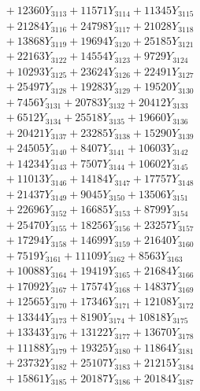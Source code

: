 \documentclass[a4paper,10pt]{article}
\begin{document}
{\begin{align}
&\;  + 12360 Y_{3113} + 11571 Y_{3114} + 11345 Y_{3115} \\[0.3ex]
&\;  + 21284 Y_{3116} + 24798 Y_{3117} + 21028 Y_{3118} \\[0.5ex]\allowbreak
&\;  + 13868 Y_{3119} + 19694 Y_{3120} + 25185 Y_{3121} \\[0.3ex]
&\;  + 22163 Y_{3122} + 14554 Y_{3123} + 9729 Y_{3124} \\[0.3ex]
&\;  + 10293 Y_{3125} + 23624 Y_{3126} + 22491 Y_{3127} \\[0.3ex]
&\;  + 25497 Y_{3128} + 19283 Y_{3129} + 19520 Y_{3130} \\[0.3ex]
&\;  + 7456 Y_{3131} + 20783 Y_{3132} + 20412 Y_{3133} \\[0.3ex]
&\;  + 6512 Y_{3134} + 25518 Y_{3135} + 19660 Y_{3136} \\[0.3ex]
&\;  + 20421 Y_{3137} + 23285 Y_{3138} + 15290 Y_{3139} \\[0.3ex]
&\;  + 24505 Y_{3140} + 8407 Y_{3141} + 10603 Y_{3142} \\[0.3ex]
&\;  + 14234 Y_{3143} + 7507 Y_{3144} + 10602 Y_{3145} \\[0.3ex]
&\;  + 11013 Y_{3146} + 14184 Y_{3147} + 17757 Y_{3148} \\[0.5ex]\allowbreak
&\;  + 21437 Y_{3149} + 9045 Y_{3150} + 13506 Y_{3151} \\[0.3ex]
&\;  + 22696 Y_{3152} + 16685 Y_{3153} + 8799 Y_{3154} \\[0.3ex]
&\;  + 25470 Y_{3155} + 18256 Y_{3156} + 23257 Y_{3157} \\[0.3ex]
&\;  + 17294 Y_{3158} + 14699 Y_{3159} + 21640 Y_{3160} \\[0.3ex]
&\;  + 7519 Y_{3161} + 11109 Y_{3162} + 8563 Y_{3163} \\[0.3ex]
&\;  + 10088 Y_{3164} + 19419 Y_{3165} + 21684 Y_{3166} \\[0.3ex]
&\;  + 17092 Y_{3167} + 17574 Y_{3168} + 14837 Y_{3169} \\[0.3ex]
&\;  + 12565 Y_{3170} + 17346 Y_{3171} + 12108 Y_{3172} \\[0.3ex]
&\;  + 13344 Y_{3173} + 8190 Y_{3174} + 10818 Y_{3175} \\[0.3ex]
&\;  + 13343 Y_{3176} + 13122 Y_{3177} + 13670 Y_{3178} \\[0.5ex]\allowbreak
&\;  + 11188 Y_{3179} + 19325 Y_{3180} + 11864 Y_{3181} \\[0.3ex]
&\;  + 23732 Y_{3182} + 25107 Y_{3183} + 21215 Y_{3184} \\[0.3ex]
&\;  + 15861 Y_{3185} + 20187 Y_{3186} + 20184 Y_{3187} \\[0.3ex]

\end{align}}
\end{document}
